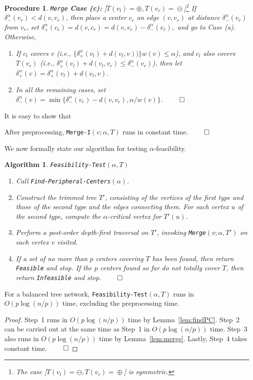 \documentclass{llncs}
\newtheorem{procedure}{Procedure}
\newtheorem{algorithm}{Algorithm}
\newcommand{\QED}{\hfill$\qed$}
\begin{document}
{\begin{procedure} {\tt Merge}
\smallskip\noindent
{\bf Case (c):}
{\rm [$T(v_l)\!=\!\oplus,T(v_r)\!=\!\ominus$]}\footnote{The case {\rm [$T(v_l)\!=\!\ominus,T(v_r)\!=\!\oplus$]}
 is symmetric.}
If $\delta_-^{\alpha}(v_r) < d(v,v_r)$,
then place a center $c_r$ on edge $(v,v_r)$ at distance $\delta_-^{\alpha}(v_r) $ from $v_r$,
set
$\delta_+^{\alpha}(c_r) = d(v,c_r)= d(v,v_r) - \delta_-^{\alpha}(v_r),$
and go to Case (a).
Otherwise,
\begin{enumerate}
\item[(i)]
If $c_l$ covers $v$ (i.e.,
$\{\delta_+^{\alpha}(v_l) + d(v_l,v))\} w(v) \leq \alpha$),
and $c_l$ also covers $T(v_r)$ (i.e.,
$\delta_+^{\alpha}(v_l) +d(v_l,v_r)\leq \delta_-^{\alpha}(v_r)$),
then  let $\delta_+^{\alpha}(v)=\delta_+^{\alpha}(v_l) + d(v_l,v)$.
\item[(ii)]
In all the remaining cases, set
$\delta_-^{\alpha}(v)=\min\{\delta_-^{\alpha}(v_r) -d(v,v_r),\alpha/w(v)\}$.
\QED
\end{enumerate}
\end{procedure}

It is easy to show that
\begin{lemma}\label{lem:merge}
After preprocessing,
{\tt Merge-I}$(v; \alpha, T)$ runs in constant time.
\QED
\end{lemma}

We now formally state our algorithm for testing $\alpha$-feasibility.
\begin{algorithm}{\tt Feasibility-Test}\label{alg:feasibility}$(\alpha,T)$
\begin{enumerate}
\item
Call {\tt Find-Peripheral-Centers}$(\alpha)$.
\item
Construct the trimmed tree $T'$, 
consisting of the vertices of the first type and those of the second type
and the edges connecting them.
For each vertex $u$ of the second type,
compute the $\alpha$-critical vertex for $T'(u)$.
\item
Perform a post-order depth-first traversal on $T'$,
invoking {\tt Merge}$(v; \alpha, T')$ on each vertex $v$ visited.
\item
If a set of no more than $p$ centers covering $T$ has been found,
then return {\tt Feasible} and stop.
If the $p$ centers found so far do not totally cover $T$,
then return {\tt Infeasible} and stop.
\QED
\end{enumerate}
\end{algorithm}

\begin{theorem}\label{thm:feasibility}
For a balanced tree network, 
{\tt Feasibility-Test}$(\alpha,T)$ runs in $O(p\log (n/p))$ time,
excluding the preprocessing time.
\end{theorem}
\begin{proof}
Step~1 runs in $O(p\log(n/p))$ time by Lemma~\ref{lem:findPC}.
Step~2 can be carried out at the same time as Step~1 in $O(p\log(n/p))$ time.
Step~3 also runs in $O(p \log (n/p))$ time  by Lemma~\ref{lem:merge}.
Lastly, Step~4 takes constant time.
\QED
\end{proof}


}
\end{document}
